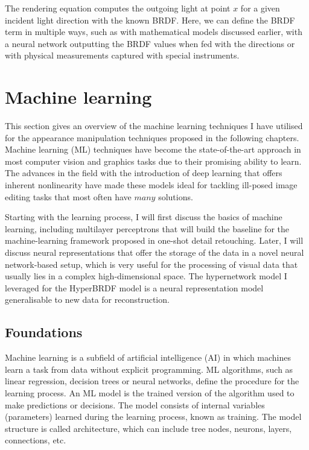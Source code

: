 The rendering equation computes the outgoing light at point $x$ for a given incident light direction with the known \gls{BRDF}. Here, we can define the \gls{BRDF} term in multiple ways, such as with mathematical models discussed earlier, with a neural network outputting the \gls{BRDF} values when fed with the directions or with physical measurements captured with special instruments. 

\section{Machine learning}
This section gives an overview of the machine learning techniques I have utilised for the appearance manipulation techniques proposed in the following chapters. Machine learning (\gls{ML}) techniques have become the state-of-the-art approach in most computer vision and graphics tasks due to their promising ability to learn. The advances in the field with the introduction of deep learning that offers inherent nonlinearity have made these models ideal for tackling ill-posed image editing tasks that most often have $many$ solutions.

Starting with the learning process, I will first discuss the basics of machine learning, including multilayer perceptrons that will build the baseline for the machine-learning framework proposed in one-shot detail retouching. Later, I will discuss neural representations that offer the storage of the data in a novel neural network-based setup, which is very useful for the processing of visual data that usually lies in a complex high-dimensional space. The hypernetwork model I leveraged for the HyperBRDF model is a neural representation model generalisable to new data for reconstruction.


\subsection{Foundations}
Machine learning is a subfield of artificial intelligence (\gls{AI}) in which machines learn a task from data without explicit programming. \gls{ML} algorithms, such as linear regression, decision trees or neural networks, define the procedure for the learning process. An \gls{ML} model is the trained version of the algorithm used to make predictions or decisions. The model consists of internal variables (parameters) learned during the learning process, known as training. The model structure is called architecture, which can include tree nodes, neurons, layers, connections, etc.

